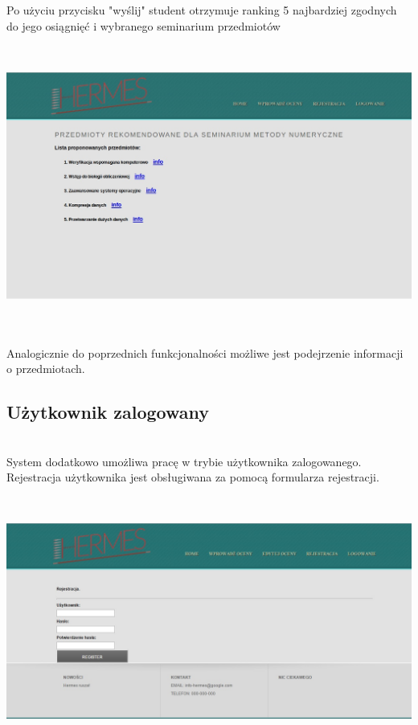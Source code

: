 \documentclass[licencjacka]{pracamgr}
\begin{document}
Po użyciu przycisku "wyślij" student otrzymuje ranking 5 najbardziej zgodnych do jego osiągnięć i wybranego seminarium przedmiotów \par
~\\
\begin{minipage}{\linewidth}
	\centering
           \includegraphics[scale=0.5]{rekPrzedmSemResult.jpg}
\end{minipage} \\ ~\\
\newpage
Analogicznie do poprzednich funkcjonalności możliwe jest podejrzenie informacji o przedmiotach.

\subsection{Użytkownik zalogowany} ~\\
\indent
System dodatkowo umożliwa pracę w trybie użytkownika zalogowanego. 
Rejestracja użytkownika jest obsługiwana za pomocą formularza rejestracji. \par
~\\
\begin{minipage}{\linewidth}
	\centering
           \includegraphics[scale=0.5]{registerForm.jpg}
\end{minipage} \\ ~\\
\end{document}
